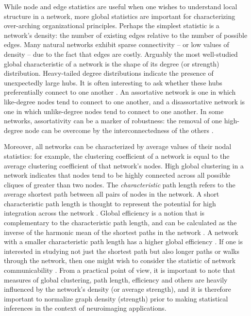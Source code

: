\documentclass[12pt]{article}
\begin{document}
While node and edge statistics are useful when one wishes to understand local structure in a network, more global statistics are important for characterizing over-arching organizational principles. Perhaps the simplest statistic is a network's density: the number of existing edges relative to the number of possible edges. Many natural networks exhibit sparse connectivity -- or low values of density -- due to the fact that edges are costly.  Arguably the most well-studied global characteristic of a network is the shape of its degree (or strength) distribution. Heavy-tailed degree distributions indicate the presence of unexpectedly large hubs. It is often interesting to ask whether these hubs preferentially connect to one another \cite{newman2002assortative}. An assortative network is one in which like-degree nodes tend to connect to one another, and a disassortative network is one in which unlike-degree nodes tend to connect to one another. In some networks, assortativity can be a marker of robustness: the removal of one high-degree node can be overcome by the interconnectedness of the others \cite{newman2002assortative,newman2003mixing}. 

Moreover, all networks can be characterized by average values of their nodal statistics: for example, the clustering coefficient of a network is equal to the average clustering coefficient of that network's nodes. High global clustering in a network indicates that nodes tend to be highly connected across all possible cliques of greater than two nodes. The \emph{characteristic} path length refers to the average shortest path between all pairs of nodes in the network. A short characteristic path length is thought to represent the potential for high integration across the network \cite{watts1998collective}. Global efficiency is a notion that is complementary to the characteristic path length, and can be calculated as the inverse of the harmonic mean of the shortest paths in the network \cite{latora2001efficient,Latora2003}. A network with a smaller characteristic path length has a higher global efficiency \cite{achard2007}. If one is interested in studying not just the shortest path but also longer paths or walks through the network, then one might wish to consider the statistic of network communicability \cite{estrada2008communicability}. From a practical point of view, it is important to note that measures of global clustering, path length, efficiency and others are heavily influenced by the network's density (or average strength), and it is therefore important to normalize graph density (strength) prior to making statistical inferences in the context of neuroimaging applications. 
\end{document}
